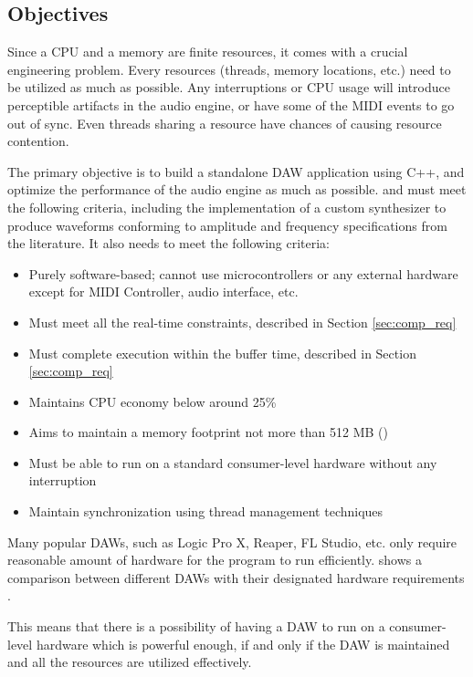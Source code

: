 \subsection{Objectives}

Since a CPU and a memory are finite resources, it comes with a crucial engineering problem. Every resources (threads, memory locations, etc.) 
need to be utilized as much as possible. Any interruptions or CPU usage will introduce perceptible artifacts in the audio
engine, or have some of the MIDI events to go out of sync. Even threads sharing a resource have chances of causing
resource contention.

The primary objective is to build a standalone DAW application using C++, and optimize the performance of the audio engine as much as possible. 
and must meet the following criteria, including the implementation of a custom synthesizer to produce waveforms conforming 
to amplitude and frequency specifications from the literature. It also needs to meet the following criteria:
\begin{itemize}
    \item Purely software-based; cannot use microcontrollers or any external hardware except for MIDI Controller, audio interface, etc.
    \item Must meet all the real-time constraints, described in Section \ref{sec:comp_req}
    \item Must complete execution within the buffer time, described in Section \ref{sec:comp_req}
    \item Maintains CPU economy below around 25\%
    \item Aims to maintain a memory footprint not more than 512 MB () \cite{anthropicclaude}
    \item Must be able to run on a standard consumer-level hardware without any interruption
    \item Maintain synchronization using thread management techniques 
\end{itemize}

Many popular DAWs, such as Logic Pro X, Reaper, FL Studio, etc. only require reasonable amount of hardware for the program to 
run efficiently. 
 shows a comparison between different DAWs with their designated 
hardware requirements \cite{integraudio_cpu_efficient_daws}.



This means that there is a possibility of having a DAW to run on a consumer-level hardware which is powerful enough,
if and only if the DAW is maintained and all the resources are utilized effectively.